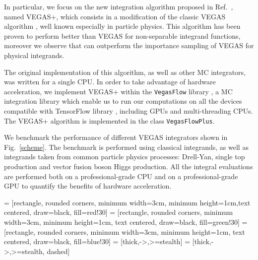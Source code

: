 \documentclass[../main/main.tex]{subfiles}
\begin{document}
In particular, we focus on the new integration algorithm proposed in Ref.~\cite{Lepage:2020tgj}, named VEGAS+, which consists in a modification of the classic VEGAS algorithm \cite{Lepage:1977sw}, well known especially in particle physics. This algorithm has been proven to perform better than VEGAS for non-separable integrand functions, moreover we observe that can outperform the importance sampling of VEGAS for physical integrands.

The original implementation of this algorithm, as well as other MC integrators, was written for a single CPU. In order to take advantage of hardware acceleration, we implement VEGAS+ within the \texttt{VegasFlow} library \cite{vegasflow_package},  a MC integration library which enable us to run our computations on all the devices compatible with TensorFlow library \cite{tensorflow2015-whitepaper}, including GPUs and multi-threading CPUs. The VEGAS+ algorithm is implemented in the class \texttt{VegasFlowPlus}.

We benchmark the performance of different VEGAS integrators shown in Fig.~\ref{scheme}.
The benchmark is performed using classical integrands, as well as integrands taken from common particle physics processes: Drell-Yan, single top production and vector fusion boson Higgs production. All the integral evaluations are performed both on a professional-grade CPU and on a professional-grade GPU to quantify the benefits of hardware acceleration.

 = [rectangle, rounded corners, minimum width=3cm, minimum height=1cm,text centered, draw=black, fill=red!30]
 = [rectangle, rounded corners, minimum width=3cm, minimum height=1cm, text centered, draw=black, fill=green!30]
 = [rectangle, rounded corners, minimum width=3cm, minimum height=1cm, text centered, draw=black, fill=blue!30]
 = [thick,->,>=stealth]
 = [thick,->,>=stealth, dashed]
\end{document}
